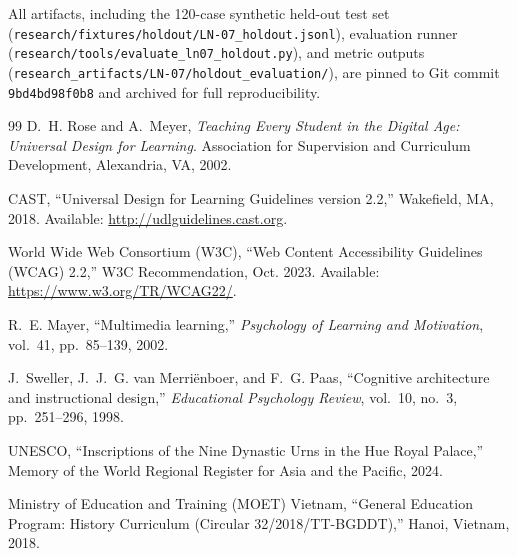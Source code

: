 \documentclass[11pt,a4paper]{article}
\begin{document}
All artifacts, including the 120-case synthetic held-out test set (\texttt{research/fixtures/holdout/LN-07\_holdout.jsonl}), evaluation runner (\texttt{research/tools/evaluate\_ln07\_holdout.py}), and metric outputs (\texttt{research\_artifacts/LN-07/holdout\_evaluation/}), are pinned to Git commit \texttt{9bd4bd98f0b8} and archived for full reproducibility.

\begin{thebibliography}{99}
D.~H. Rose and A.~Meyer, \emph{Teaching Every Student in the Digital Age: Universal Design for Learning}. Association for Supervision and Curriculum Development, Alexandria, VA, 2002.

CAST, ``Universal Design for Learning Guidelines version 2.2,'' Wakefield, MA, 2018. Available: \url{http://udlguidelines.cast.org}.

World Wide Web Consortium (W3C), ``Web Content Accessibility Guidelines (WCAG) 2.2,'' W3C Recommendation, Oct. 2023. Available: \url{https://www.w3.org/TR/WCAG22/}.

R.~E. Mayer, ``Multimedia learning,'' \emph{Psychology of Learning and Motivation}, vol.~41, pp.~85--139, 2002.

J.~Sweller, J.~J.~G. van Merri\"{e}nboer, and F.~G. Paas, ``Cognitive architecture and instructional design,'' \emph{Educational Psychology Review}, vol.~10, no.~3, pp.~251--296, 1998.

UNESCO, ``Inscriptions of the Nine Dynastic Urns in the Hue Royal Palace,'' Memory of the World Regional Register for Asia and the Pacific, 2024.

Ministry of Education and Training (MOET) Vietnam, ``General Education Program: History Curriculum (Circular 32/2018/TT-BGDDT),'' Hanoi, Vietnam, 2018.
\end{thebibliography}
\end{document}
